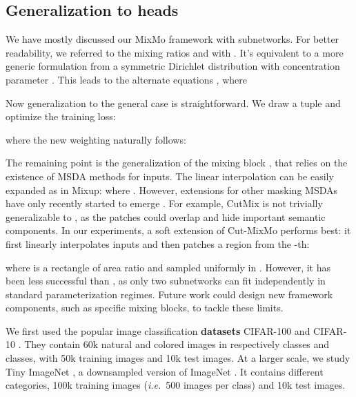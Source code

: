 \documentclass[10pt,twocolumn,letterpaper]{article}
\begin{document}
 \subsection{Generalization to  heads}
\label{app:mheads}

We have mostly discussed our MixMo framework with  subnetworks. For better
readability, we referred to the mixing ratios 
and  with . It's equivalent to a more
generic formulation  from a symmetric Dirichlet distribution with concentration parameter .
This leads to the alternate equations
,\linebreak
where 

Now generalization to the general case  is straightforward. We draw a
tuple  and optimize the
training loss: 

where the new weighting naturally follows:


The remaining point is the generalization of the mixing block ,
that relies on the existence of MSDA methods for  inputs. The linear
interpolation can be easily expanded as in Mixup:
where . However, extensions for other masking MSDAs have only
recently started to emerge \cite{kim2021comixup}. For example, CutMix is not
trivially generalizable to , as the patches could overlap and hide
important semantic components. In our experiments, a soft extension of Cut-MixMo performs best: it first linearly interpolates  inputs and then patches a region from the -th:

where  is a rectangle of area ratio  and  sampled
uniformly in . However, it has been less successful than
, as only two subnetworks can fit independently in standard parameterization regimes. Future work could design new framework components, such as specific mixing blocks, to tackle these limits.%
\label{app:expe}

We first used the popular image classification \textbf{datasets} CIFAR-100 and
CIFAR-10 \cite{krizhevsky2009learning}. They contain 60k  natural
and colored images in respectively  classes and  classes, with 50k
training images and 10k test images. At a larger scale, we study Tiny ImageNet
\cite{chrabaszcz2017}, a downsampled version of ImageNet \cite{imagenet_cvpr09}.
It contains  different categories, 100k  training images
(\textit{i.e.}\ 500 images per class) and 10k test images.
\end{document}

